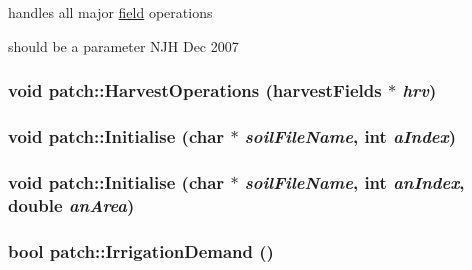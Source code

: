 handles all major \hyperlink{classfield}{field} operations 

should be a parameter NJH Dec 2007 \hypertarget{classpatch_a79dd8d0f305e1ec56041fb8c041297cf}{
\subsubsection[{HarvestOperations}]{\setlength{\rightskip}{0pt plus 5cm}void patch::HarvestOperations ({\bf harvestFields} $\ast$ {\em hrv})}}
\label{classpatch_a79dd8d0f305e1ec56041fb8c041297cf}
\hypertarget{classpatch_a92a760b5e2e027638c445888038d82fe}{
\subsubsection[{Initialise}]{\setlength{\rightskip}{0pt plus 5cm}void patch::Initialise (char $\ast$ {\em soilFileName}, \/  int {\em aIndex})}}
\label{classpatch_a92a760b5e2e027638c445888038d82fe}
\hypertarget{classpatch_aed7ec6869d21a7bae66741051b8056e2}{
\subsubsection[{Initialise}]{\setlength{\rightskip}{0pt plus 5cm}void patch::Initialise (char $\ast$ {\em soilFileName}, \/  int {\em anIndex}, \/  double {\em anArea})}}
\label{classpatch_aed7ec6869d21a7bae66741051b8056e2}
\hypertarget{classpatch_add167b75947d6b59109dbd911d8ab681}{
\subsubsection[{IrrigationDemand}]{\setlength{\rightskip}{0pt plus 5cm}bool patch::IrrigationDemand ()}}
\label{classpatch_add167b75947d6b59109dbd911d8ab681}


